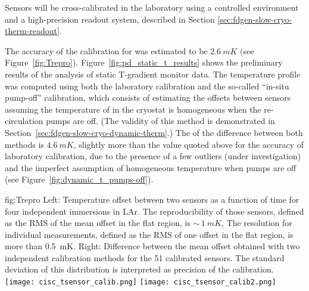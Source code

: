 Sensors will be cross-calibrated in the laboratory using a controlled environment and a high-precision readout system, described in Section \ref{sec:fdgen-slow-cryo-therm-readout}.

The accuracy of the calibration for  was estimated to be $\SI{2.6}{mK}$ (see Figure~\ref{fig:Trepro}). Figure~\ref{fig:pd_static_t_results} shows the preliminary results of the analysis of  static T-gradient monitor data. The temperature profile was computed using both the laboratory calibration and the so-called ``in-situ pump-off'' calibration, which consists %
of estimating the offsets between sensors assuming the temperature of \lar in the cryostat is homogeneous when the re-circulation pumps are off. (The validity of this method is demonstrated in Section~\ref{sec:fdgen-slow-cryo-dynamic-therm}.)  
The  of the difference between both methods is $\SI{4.6}{mK}$, slightly more than the value quoted above for the accuracy of laboratory calibration, due to the presence of a few outliers (under investigation) and the imperfect assumption of homogeneous temperature when pumps are off (see Figure~\ref{fig:dynamic_t_pumps-off}).  

\begin{dunefigure}{fig:Trepro}{
 Left:   Temperature offset between two sensors as a function of time for four independent immersions in LAr. The reproducibility of those sensors, defined as the RMS of the mean offset in the flat region, is $\sim\,\SI{1}{mK}$,
    The resolution for individual measurements, defined as the RMS of one offset in the flat region, is more than \SI{0.5}{mK}. Right: Difference between the mean offset obtained with two independent calibration methods for the 51 calibrated sensors. The standard deviation of this distribution is interpreted as precision of the calibration.}
  \texttt{[image: cisc\_tsensor\_calib.png]}%
  \texttt{[image: cisc\_tsensor\_calib2.png]}%
\end{dunefigure}



